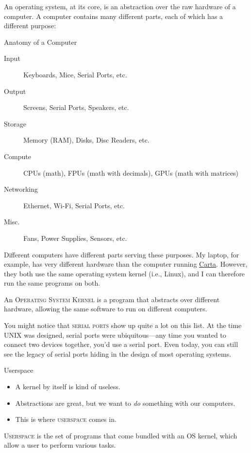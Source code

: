 An operating system, at its core, is an abstraction over the raw hardware of a
computer. A computer contains many different parts, each of which has a
different purpose:

\begin{frame}{Anatomy of a Computer}
  \pause
  \begin{description}
    \item[Input]
      Keyboards, Mice, \alert<8>{Serial Ports}, etc.\pause
    \item[Output]
      Screens, \alert<8>{Serial Ports}, Speakers, etc.\pause
    \item[Storage]
      Memory (RAM), Disks, Disc Readers, etc.\pause
    \item[Compute]
      CPUs (math), FPUs (math with decimals), GPUs (math with matrices)\pause
    \item[Networking]
      Ethernet, Wi-Fi, \alert<8>{Serial Ports}, etc.\pause
    \item[Misc.]
      Fans, Power Supplies, Sensors, etc.\pause\pause
  \end{description}
   {
    Different computers have different parts serving these purposes.  My
    laptop, for example, has very different hardware than the computer running
    \href{https://carta.stanford.edu}{Carta}.  However, they both use the same
    operating system kernel (i.e., Linux), and I can therefore run the same
    programs on both.
  }
  \begin{definition}[kernel]
    An \textsc{Operating System Kernel} is a program that abstracts over
    different hardware, allowing the same software to run on different
    computers.
  \end{definition}
\end{frame}

You might notice that \textsc{serial ports} show up quite a lot on this list.
At the time UNIX was designed, serial ports were ubiquitous---any time you
wanted to connect two devices together, you'd use a serial port.  Even today,
you can still see the legacy of serial ports hiding in the design of most
operating systems.

\begin{frame}{Userspace}
  \begin{itemize}
    \item
      A kernel by itself is kind of useless.\pause
    \item
      Abstractions are great, but we want to \textit{do} something with our
      computers.\pause
    \item
      This is where \textsc{userspace} comes in.\pause
  \end{itemize}
  \begin{definition}[userspace]
    \textsc{Userspace} is the set of programs that come bundled with an OS
    kernel, which allow a user to perform various tasks.
  \end{definition}
\end{frame}

